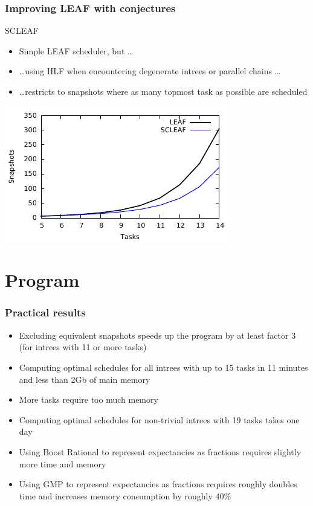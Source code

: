 \documentclass{beamer}
\begin{document}
\begin{frame}
  \frametitle{Improving LEAF with conjectures}
  \begin{block}{SCLEAF}
    \begin{itemize}
    \item Simple LEAF scheduler, but \dots
    \item \dots using HLF when encountering degenerate intrees or parallel chains \dots
    \item \dots restricts to snapshots where as many topmost task as possible are scheduled
    \end{itemize}
  \end{block}
  \begin{center}
    \includegraphics{scleaf.pdf}
  \end{center}
\end{frame}

\section{Program}

\begin{frame}
  \frametitle{Practical results}
  \begin{itemize}
  \item Excluding equivalent snapshots speeds up the program by at least factor 3 (for intrees with 11 or more tasks)
  \item Computing optimal schedules for all intrees with up to 15 tasks in 11 minutes and less than 2Gb of main memory
  \item More tasks require too much memory
  \item Computing optimal schedules for non-trivial intrees with 19 tasks takes one day
  \item Using Boost Rational to represent expectancies as fractions requires slightly more time and memory
  \item Using GMP to represent expectancies as fractions requires roughly doubles time and increases memory consumption by roughly 40\%
  \end{itemize}
\end{frame}
\end{document}

